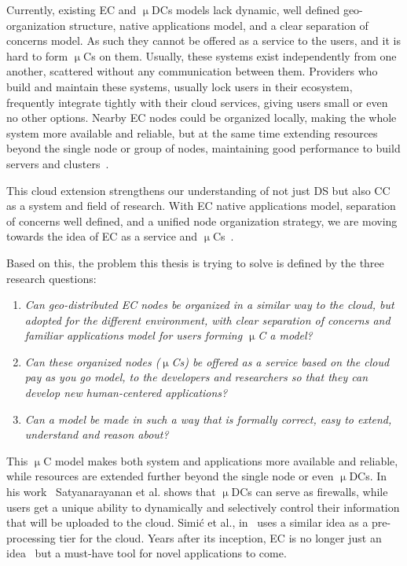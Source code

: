 Currently, existing EC and $\upmu$DCs models lack dynamic, well defined geo-organization structure, native applications model, and a clear separation of concerns model. As such they cannot be offered as a service to the users, and it is hard to form $\upmu$Cs on them. Usually, these systems exist independently from one another, scattered without any communication between them. Providers who build and maintain these systems, usually lock users in their ecosystem, frequently integrate tightly with their cloud services, giving users small or even no other options. Nearby EC nodes could be organized locally, making the whole system more available and reliable, but at the same time extending resources beyond the single node or group of nodes, maintaining good performance to build servers and clusters~\cite{ArocaG12}.

This cloud extension strengthens our understanding of not just DS but also CC as a system and field of research. With EC native applications model, separation of concerns well defined, and a unified node organization strategy, we are moving towards the idea of EC as a service and $\upmu$Cs~\cite{SimicAccess}. 

Based on this, the problem this thesis is trying to solve is defined by the three research questions:

\begin{enumerate}[start=1,label={(\bfseries \arabic*)}]\label{questions}
	\item \textit{Can geo-distributed EC nodes be organized in a similar  way to the cloud, but adopted for the different environment, with clear separation of concerns and familiar applications model for users forming $\upmu$C a model?}
	\item \textit{Can these organized nodes ($\upmu$Cs) be offered as a service based on the cloud pay as you go model, to the developers and researchers so that they can develop new human-centered applications?}
	\item \textit{Can a model be made in such a way that is formally correct, easy to extend, understand and reason about?}
\end{enumerate}

\noindent
This $\upmu$C model makes both system and applications more available and reliable, while resources are extended further beyond the single node or even $\upmu$DCs. In his work~\cite{SatyanarayananK19} Satyanarayanan et al. shows that $\upmu$DCs can serve as firewalls, while users get a unique ability to dynamically and selectively control their information that will be uploaded to the cloud.  Simi\' c et al., in~\cite{inproceedingsSimic1} uses a similar idea as a pre-processing tier for the cloud. Years after its inception, EC is no longer just an idea~\cite{SatyanarayananK19} but a must-have tool for novel applications to come. 
%
%
